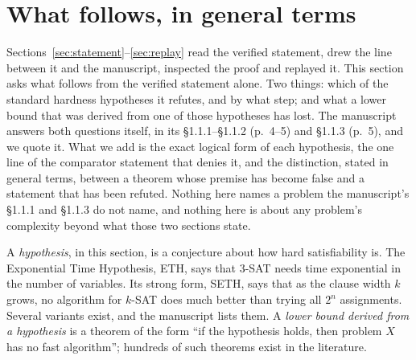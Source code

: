 \section{What follows, in general terms}
\label{sec:consequences}

Sections~\ref{sec:statement}--\ref{sec:replay} read the verified
statement, drew the line between it and the manuscript, inspected the
proof and replayed it. This section asks what follows from the verified
statement alone. Two things: which of the standard hardness hypotheses
it refutes, and by what step; and what a lower bound that was derived
from one of those hypotheses has lost. The manuscript answers both
questions itself, in its \S1.1.1--\S1.1.2 (p.~4--5) and \S1.1.3 (p.~5),
and we quote it. What we add is the exact logical form of each
hypothesis, the one line of the comparator statement that denies it, and
the distinction, stated in general terms, between a theorem whose
premise has become false and a statement that has been refuted. Nothing
here names a problem the manuscript's \S1.1.1 and \S1.1.3 do not name,
and nothing here is about any problem's complexity beyond what those two
sections state.

A \emph{hypothesis}, in this section, is a conjecture about how hard
satisfiability is. The Exponential Time Hypothesis, ETH, says that
3-SAT needs time exponential in the number of variables. Its strong
form, SETH, says that as the clause width $k$ grows, no algorithm for
$k$-SAT does much better than trying all $2^n$ assignments. Several
variants exist, and the manuscript lists them. A \emph{lower bound
derived from a hypothesis} is a theorem of the form ``if the hypothesis
holds, then problem $X$ has no fast algorithm''; hundreds of such
theorems exist in the literature.

